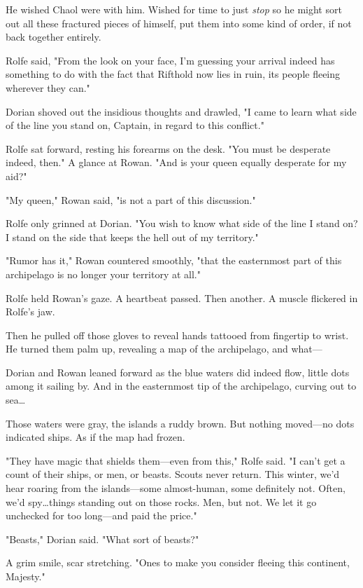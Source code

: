 He wished Chaol were with him.
Wished for time to just 
\emph{stop} so he might sort out all these fractured pieces of himself, put them into some kind of order, if not back together entirely.

Rolfe said, "From the look on your face, I'm guessing your arrival indeed has something to do with the fact that Rifthold now lies in ruin, its people fleeing wherever they can."

Dorian shoved out the insidious thoughts and drawled, "I came to learn what side of the line you stand on, Captain, in regard to this conflict."

Rolfe sat forward, resting his forearms on the desk.
"You must be desperate indeed, then."
A glance at Rowan.
"And is your queen equally desperate for my aid?"

"My queen," Rowan said, "is not a part of this discussion."

Rolfe only grinned at Dorian.
"You wish to know what side of the line I stand on?
I stand on the side that keeps the hell out of my territory."

"Rumor has it," Rowan countered smoothly, "that the easternmost part of this archipelago is no longer your territory at all."

Rolfe held Rowan's gaze.
A heartbeat passed.
Then another.
A muscle flickered in Rolfe's jaw.

Then he pulled off those gloves to reveal hands tattooed from fingertip to wrist.
He turned them palm up, revealing a map of the archipelago, and what---

Dorian and Rowan leaned forward as the blue waters did indeed flow, little dots among it sailing by.
And in the easternmost tip of the archipelago, curving out to sea\ldots{}

Those waters were gray, the islands a ruddy brown.
But nothing moved---no dots indicated ships.
As if the map had frozen.

"They have magic that shields them---even from this," Rolfe said.
"I can't get a count of their ships, or men, or beasts.
Scouts never return.
This winter, we'd hear roaring from the islands---some almost-human, some definitely not.
Often, we'd spy\ldots things standing out on those rocks.
Men, but not.
We let it go unchecked for too long---and paid the price."

"Beasts," Dorian said.
"What sort of beasts?"

A grim smile, scar stretching.
"Ones to make you consider fleeing this continent, Majesty."

